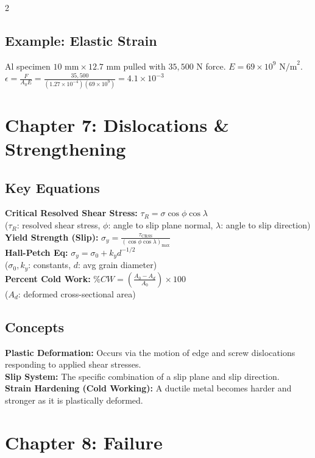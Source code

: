 \documentclass[8pt]{article}
\begin{document}
\begin{multicols*}{2}
  \subsection*{Example: Elastic Strain}
  Al specimen \( 10 \text{ mm} \times 12.7 \text{ mm} \) pulled with \( 35,500 \text{ N} \) force. \( E = 69\times 10^9 \text{ N/m}^2 \). \\
  \( \epsilon = \frac{F}{A_0 E} = \frac{35,500}{(1.27\times 10^{-4})(69\times 10^9)} = 4.1\times 10^{-3} \)

  \section*{Chapter 7: Dislocations \& Strengthening}
  \subsection*{Key Equations}
  \textbf{Critical Resolved Shear Stress:} \( \tau_R = \sigma \cos\phi \cos\lambda \) \\
  (\( \tau_R \): resolved shear stress, \( \phi \): angle to slip plane normal, \( \lambda \): angle to slip direction) \\

  \textbf{Yield Strength (Slip):} \( \sigma_y = \frac{\tau_{\text{CRSS}}}{(\cos\phi \cos\lambda)_{\max}} \) \\

  \textbf{Hall-Petch Eq:} \( \sigma_y = \sigma_0 + k_y d^{-1/2} \) \\
  (\( \sigma_0, k_y \): constants, \( d \): avg grain diameter) \\

  \textbf{Percent Cold Work:} \( \%CW = \left(\frac{A_0 - A_d}{A_0}\right) \times 100 \) \\
  (\( A_d \): deformed cross-sectional area)

  \subsection*{Concepts}
  \textbf{Plastic Deformation:} Occurs via the motion of edge and screw dislocations responding to applied shear stresses. \\
  \textbf{Slip System:} The specific combination of a slip plane and slip direction. \\
  \textbf{Strain Hardening (Cold Working):} A ductile metal becomes harder and stronger as it is plastically deformed.

  \section*{Chapter 8: Failure}

\end{multicols*}
\end{document}
